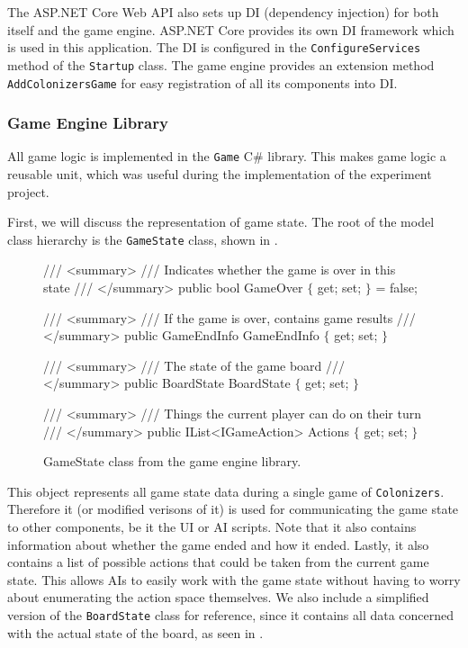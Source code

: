 The ASP.NET Core Web API also sets up DI (dependency injection) for both itself and
the game engine. ASP.NET Core provides its own DI framework
which is used in this application. The DI is configured in the
\texttt{ConfigureServices} method of the \texttt{Startup} class.
The game engine provides an extension method \texttt{AddColonizersGame}
for easy registration of all its components into DI.

\subsubsection{Game Engine Library}
\label{subsub:gelibrary}

All game logic is implemented in the \texttt{Game} C\# library. This
makes game logic a reusable unit, which was useful during the implementation of
the experiment project.

First, we will discuss the representation of game state. The root
of the model class hierarchy is the \texttt{GameState} class, shown in .

\begin{figure}[ht]
\begin{code}[commandchars=\\\{\},codes={\catcode`\$=3\catcode`\^=7\catcode`\_=8}]
/// <summary>
/// Indicates whether the game is over in this state
/// </summary>
public bool GameOver $\{$ get; set; $\}$ = false;

/// <summary>
/// If the game is over, contains game results
/// </summary>
public GameEndInfo GameEndInfo $\{$ get; set; $\}$

/// <summary>
/// The state of the game board
/// </summary>
public BoardState BoardState $\{$ get; set; $\}$

/// <summary>
/// Things the current player can do on their turn
/// </summary>
public IList<IGameAction> Actions $\{$ get; set; $\}$
\end{code}
\caption{GameState class from the game engine library.}\label{dd:gamestate}
\end{figure}

This object represents all game state data during a single game of \texttt{Colonizers}.
Therefore it (or modified verisons of it) is used for communicating the game state
to other components, be it the UI or AI scripts. Note that it also contains information
about whether the game ended and how it ended. Lastly, it also contains a list of possible
actions that could be taken from the current game state. This allows AIs to easily
work with the game state without having to worry about enumerating the action
space themselves. We also include a simplified version of the \texttt{BoardState} class
for reference,
since it contains all data concerned with the actual state of the board, as seen
in .

